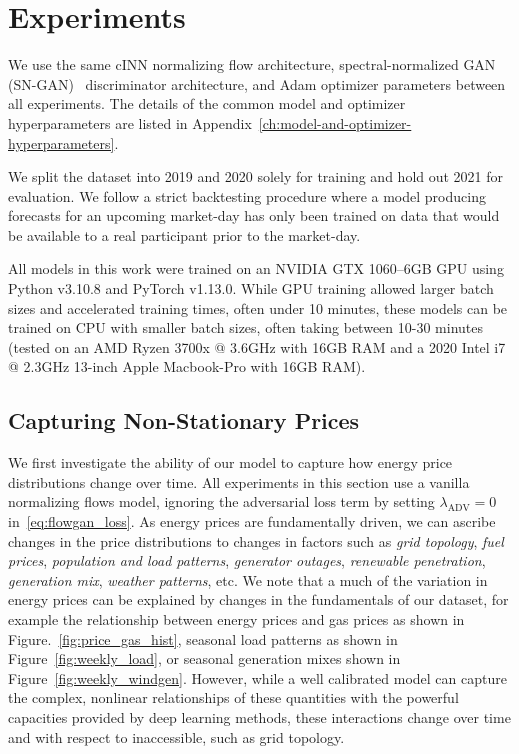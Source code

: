 \chapter{Experiments}\label{ch:experiments}

We use the same cINN normalizing flow architecture, spectral-normalized GAN (SN-GAN)~\cite{sngan} discriminator architecture, and
Adam optimizer parameters between all experiments.
The details of the common model and optimizer hyperparameters are listed in Appendix~\ref{ch:model-and-optimizer-hyperparameters}.

We split the dataset into 2019 and 2020 solely for training and hold out 2021 for evaluation.
We follow a strict backtesting procedure where a model producing forecasts for an upcoming market-day has only been
trained on data that would be available to a real participant prior to the market-day.

All models in this work were trained on an NVIDIA GTX 1060--6GB GPU using Python v3.10.8 and PyTorch v1.13.0.
While GPU training allowed larger batch sizes and accelerated training times, often under 10 minutes, these
models can be trained on CPU with smaller batch sizes, often taking between 10-30 minutes (tested on an AMD
Ryzen 3700x @ 3.6GHz with 16GB RAM and a 2020 Intel i7 @ 2.3GHz 13-inch Apple Macbook-Pro with 16GB RAM).

\section{Capturing Non-Stationary Prices}\label{sec:capturing-non-stationary-prices}

We first investigate the ability of our model to capture how energy price distributions change over time.
All experiments in this section use a vanilla normalizing flows model, ignoring the adversarial loss term by setting
$\lambda_{\text{ADV}} = 0$ in~\eqref{eq:flowgan_loss}.
As energy prices are fundamentally driven, we can ascribe changes in the price distributions to changes in factors such
as \textit{grid topology}, \textit{fuel prices}, \textit{population and load patterns}, \textit{generator outages},
\textit{renewable penetration}, \textit{generation mix}, \textit{weather patterns}, etc.
We note that a much of the variation in energy prices can be explained by changes in the fundamentals of our dataset,
for example the relationship between energy prices and gas prices as shown in Figure.~\ref{fig:price_gas_hist},
seasonal load patterns as shown in Figure~\ref{fig:weekly_load}, or seasonal generation mixes shown in
Figure~\ref{fig:weekly_windgen}.
However, while a well calibrated model can capture the complex, nonlinear relationships of these quantities with the powerful
capacities provided by deep learning methods, these interactions change over time and with respect to inaccessible,
such as grid topology.

